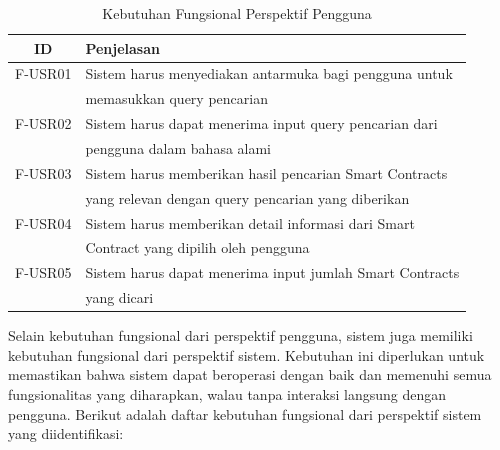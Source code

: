 \begin{table}[ht]
	\caption{Kebutuhan Fungsional Perspektif Pengguna}
	\vspace{0.25cm}
	\begin{center}
		\begin{tabular}{|c|l|}
			\hline
			\textbf{ID} & \textbf{Penjelasan} \\ \hline
			F-USR01 & Sistem harus menyediakan antarmuka bagi pengguna untuk \\ & memasukkan query pencarian \\ \hline
			F-USR02 & Sistem harus dapat menerima input query pencarian dari \\ & pengguna dalam bahasa alami \\ \hline
			F-USR03 & Sistem harus memberikan hasil pencarian Smart Contracts \\ & yang relevan dengan query pencarian yang diberikan \\ \hline
			F-USR04 & Sistem harus memberikan detail informasi dari Smart \\ & Contract yang dipilih oleh pengguna \\ \hline
			F-USR05 & Sistem harus dapat menerima input jumlah Smart Contracts \\ & yang dicari \\ \hline
		\end{tabular}
	\end{center}
\end{table}

\break

Selain kebutuhan fungsional dari perspektif pengguna, sistem juga memiliki kebutuhan fungsional dari perspektif sistem. Kebutuhan ini diperlukan untuk memastikan bahwa sistem dapat beroperasi dengan baik dan memenuhi semua fungsionalitas yang diharapkan, walau tanpa interaksi langsung dengan pengguna. Berikut adalah daftar kebutuhan fungsional dari perspektif sistem yang diidentifikasi:

